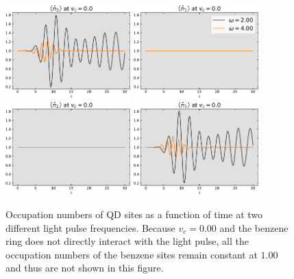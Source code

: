 \begin{figure}[!hbt]
    \centering
    \includegraphics[width=0.43\textwidth]{graph/occupation/occupation_site_0_vc_00.pdf}
    \includegraphics[width=0.43\textwidth]{graph/occupation/occupation_site_1_vc_00.pdf}
    \includegraphics[width=0.43\textwidth]{graph/occupation/occupation_site_2_vc_00.pdf}
    \includegraphics[width=0.43\textwidth]{graph/occupation/occupation_site_3_vc_00.pdf}
    \caption{Occupation numbers of QD sites as a function of time at two different light pulse frequencies. Because $v_c=0.00$ and the benzene ring does not directly interact with the light pulse, all the occupation numbers of the benzene sites remain constant at $1.00$ and thus are not shown in this figure.}
    \label{fig:occupation_vc_00}
\end{figure}

